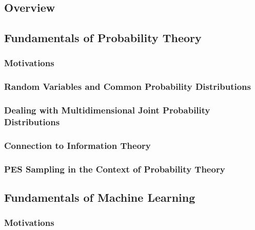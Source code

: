 \documentclass[%
aip,
rmp,
10pt, 
amsmath,
amssymb,
floatfix,
nofootinbib,
]{revtex4-2}
\begin{document}
\subsection{Overview}\label{sec:ml_overview}
 

\subsection{Fundamentals of Probability Theory}
\label{sec:prob_theory_fundamentals}

\subsubsection{Motivations}


\subsubsection{Random Variables and Common Probability Distributions} 

 
\subsubsection{Dealing with Multidimensional Joint Probability Distributions}


\subsubsection{Connection to Information Theory}


\subsubsection{PES Sampling in the Context of Probability Theory}
\label{sec:ML_AI_PES_sampling_info_theory}


\subsection{Fundamentals of Machine Learning}\label{sec:ml_fundamentals}

\subsubsection{Motivations}

\end{document}
